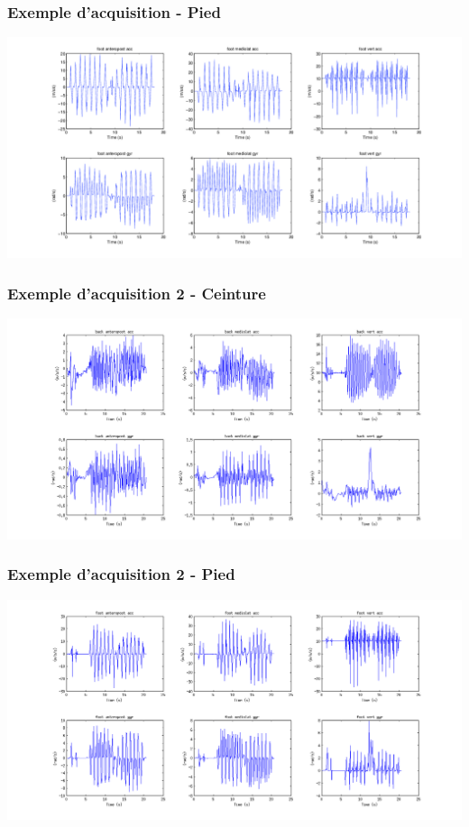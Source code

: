 \documentclass{beamer}
\begin{document}
\begin{frame}
	\frametitle{Exemple d'acquisition - Pied}

			\hspace*{-2.75cm}\includegraphics[scale=0.4]{examplevisufoot}

\end{frame}

\begin{frame}
	\frametitle{Exemple d'acquisition 2 - Ceinture}

			\hspace*{-2.75cm}\includegraphics[scale=0.40]{errorexamplevisuback}

\end{frame}

\begin{frame}
	\frametitle{Exemple d'acquisition 2 - Pied}

			\hspace*{-2.75cm}\includegraphics[scale=0.4]{errorexamplevisufoot}

\end{frame}
\end{document}
